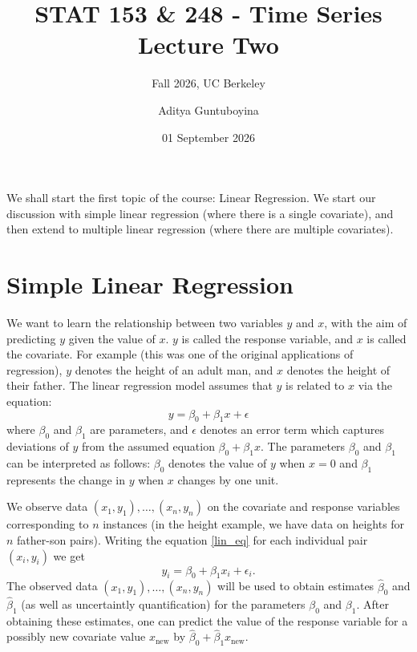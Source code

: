 \documentclass{scrartcl}
\begin{document}
\title{STAT 153 \& 248 - Time Series  \\
  Lecture Two} 
\subtitle{Fall 2026, UC Berkeley}
\author{Aditya Guntuboyina}

\date{01 September 2026}

\maketitle


We shall start the first topic of the course: Linear Regression. We
start our discussion with simple linear regression (where there is a
single covariate), and then extend to multiple linear regression
(where there are multiple covariates). 

\section{Simple Linear Regression}
We want to learn the relationship between two variables $y$ and
$x$, with the aim of predicting $y$ given the value of $x$. $y$ is
called the response variable, and $x$ is called the covariate. For
example (this was one of the original applications of regression), $y$
denotes the height of an adult man, and $x$ denotes the height of
their father. The linear regression model assumes that $y$ is related
to $x$ via the equation:
\begin{equation}\label{lin_eq}
  y = \beta_0 + \beta_1 x + \epsilon
\end{equation}
where $\beta_0$ and $\beta_1$ are parameters, and $\epsilon$ denotes
an error term which captures deviations of $y$ from the assumed
equation $\beta_0 + \beta_1 x$. The parameters $\beta_0$ and $\beta_1$
can be interpreted as follows: $\beta_0$ denotes the value of $y$ when
$x = 0$ and $\beta_1$ represents the change in $y$ when $x$ changes by
one unit. 

We observe data $(x_1, y_1), \dots, (x_n, y_n)$ on the covariate and
response variables corresponding to $n$ instances (in the height
example, we have data on heights for $n$ father-son pairs). Writing
the equation \eqref{lin_eq} for each individual pair $(x_i, y_i)$ we
get
\begin{equation}\label{linmod}
  y_i = \beta_0 + \beta_1 x_i + \epsilon_i. 
\end{equation}
The observed data $(x_1, y_1), \dots, (x_n, y_n)$ will be used to
obtain estimates $\hat{\beta}_0$ and $\hat{\beta}_1$ (as well as
uncertaintly quantification) for the parameters $\beta_0$ and
$\beta_1$. After obtaining these estimates, one can predict the value
of the response variable for a possibly new covariate value
$x_{\text{new}}$ by $\hat{\beta}_0 + \hat{\beta}_1
x_{\text{new}}$.
\end{document}

